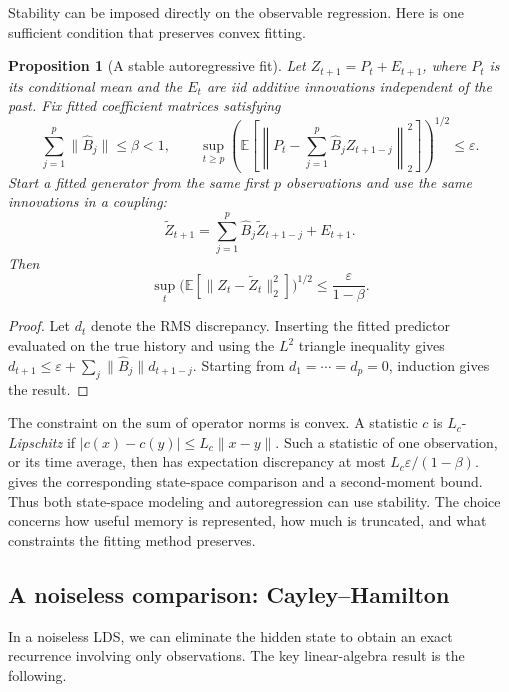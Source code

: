\documentclass[11pt,twoside]{article}
\newcommand{\E}{\mathbb E}
\newtheorem{proposition}[theorem]{Proposition}
\theoremstyle{definition}
\theoremstyle{remark}
\begin{document}
Stability can be imposed directly on the observable regression.
Here is one sufficient condition that preserves convex fitting.

\begin{proposition}[A stable autoregressive fit]
\label{prop:stable-ar}
Let \(Z_{t+1}=P_t+E_{t+1}\), where \(P_t\) is its conditional mean
and the \(E_t\) are iid additive innovations independent of the past.
Fix fitted coefficient matrices satisfying
\[
 \sum_{j=1}^p\lVert\widehat B_j\rVert\le\beta<1,\qquad
 \sup_{t\ge p}
 \left(\E\left[
 \left\lVert P_t-\sum_{j=1}^p\widehat B_jZ_{t+1-j}\right\rVert_2^2
 \right]\right)^{1/2}\le\varepsilon.
\]
Start a fitted generator from the same first \(p\) observations and
use the same innovations in a coupling:
\[
 \widetilde Z_{t+1}
 =\sum_{j=1}^p\widehat B_j\widetilde Z_{t+1-j}+E_{t+1}.
\]
Then
\begin{equation}
 \sup_t\bigl(\E[\lVert Z_t-\widetilde Z_t\rVert_2^2]\bigr)^{1/2}
 \le\frac{\varepsilon}{1-\beta}.
 \label{eq:stable-ar}
\end{equation}
\end{proposition}

\begin{proof}
Let \(d_t\) denote the RMS discrepancy. Inserting the fitted predictor
evaluated on the true history and using the \(L^2\) triangle inequality
gives \(d_{t+1}\le\varepsilon+\sum_j\lVert\widehat B_j\rVert d_{t+1-j}\).
Starting from \(d_1=\cdots=d_p=0\), induction gives the result.
\end{proof}

The constraint on the sum of operator norms is convex.
A statistic \(c\) is \(L_c\)-\emph{Lipschitz} if
\(|c(x)-c(y)|\le L_c\|x-y\|\).
Such a statistic of one observation, or its time average,
then has expectation discrepancy at most
\(L_c\varepsilon/(1-\beta)\).
 gives the corresponding state-space comparison
and a second-moment bound.
Thus both state-space modeling and autoregression can use stability.
The choice concerns how useful memory is represented, how much is
truncated, and what constraints the fitting method preserves.

\subsection{A noiseless comparison: Cayley--Hamilton}
\label{sec:cayley-hamilton}

In a noiseless LDS, we can eliminate the hidden state to obtain an exact
recurrence involving only observations. The key linear-algebra result
is the following.
\end{document}
